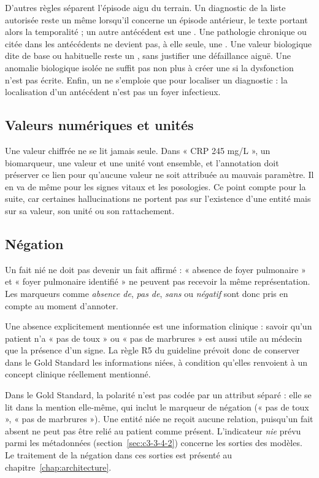 D’autres règles séparent l’épisode aigu du terrain. Un diagnostic de la liste autorisée reste un  même lorsqu’il concerne un épisode antérieur, le texte portant alors la temporalité ; un autre antécédent est une . Une pathologie chronique ou citée dans les antécédents ne devient pas, à elle seule, une . Une valeur biologique dite de base ou habituelle reste un , sans justifier une défaillance aiguë. Une anomalie biologique isolée ne suffit pas non plus à créer une  si la dysfonction n’est pas écrite. Enfin, un  ne s’emploie que pour localiser un diagnostic : la localisation d’un antécédent n’est pas un foyer infectieux.

\subsection{Valeurs numériques et unités}\label{sec:c3-3-6-3}

Une valeur chiffrée ne se lit jamais seule. Dans « CRP 245 mg/L », un biomarqueur, une valeur et une unité vont ensemble, et l’annotation doit préserver ce lien pour qu’aucune valeur ne soit attribuée au mauvais paramètre. Il en va de même pour les signes vitaux et les posologies. Ce point compte pour la suite, car certaines hallucinations ne portent pas sur l’existence d’une entité mais sur sa valeur, son unité ou son rattachement.

\subsection{Négation}\label{sec:c3-3-6-4}

Un fait nié ne doit pas devenir un fait affirmé : « absence de foyer pulmonaire » et « foyer pulmonaire identifié » ne peuvent pas recevoir la même représentation. Les marqueurs comme \emph{absence de}, \emph{pas de}, \emph{sans} ou \emph{négatif} sont donc pris en compte au moment d’annoter.

Une absence explicitement mentionnée est une information clinique : savoir qu’un patient n’a « pas de toux » ou « pas de marbrures » est aussi utile au médecin que la présence d’un signe. La règle R5 du guideline prévoit donc de conserver dans le Gold Standard les informations niées, à condition qu’elles renvoient à un concept clinique réellement mentionné.

Dans le Gold Standard, la polarité n’est pas codée par un attribut séparé : elle se lit dans la mention elle-même, qui inclut le marqueur de négation (« pas de toux », « pas de marbrures »). Une entité niée ne reçoit aucune relation, puisqu’un fait absent ne peut pas être relié au patient comme présent. L’indicateur \emph{nie} prévu parmi les métadonnées (section~\ref{sec:c3-3-4-2}) concerne les sorties des modèles. Le traitement de la négation dans ces sorties est présenté au chapitre~\ref{chap:architecture}.

